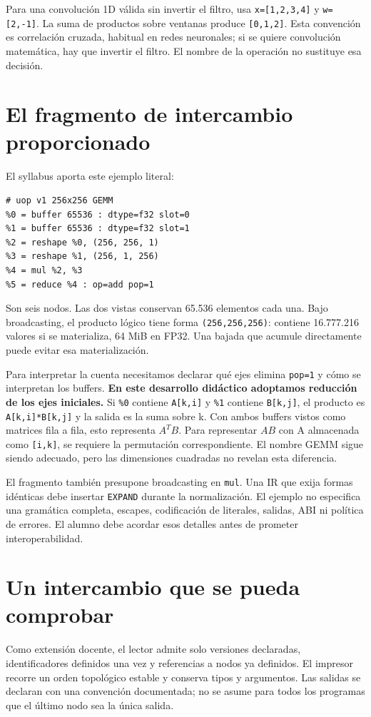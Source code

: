 \documentclass[12pt,a4paper,oneside]{report}
\begin{document}
Para una convolución 1D válida sin invertir el filtro, usa \texttt{x=[1,2,3,4]} y \texttt{w=[2,-1]}. La suma de productos sobre ventanas produce \texttt{[0,1,2]}. Esta convención es correlación cruzada, habitual en redes neuronales; si se quiere convolución matemática, hay que invertir el filtro. El nombre de la operación no sustituye esa decisión.

\section{El fragmento de intercambio proporcionado}
El syllabus aporta este ejemplo literal:

\begin{lstlisting}
# uop v1 256x256 GEMM
%0 = buffer 65536 : dtype=f32 slot=0
%1 = buffer 65536 : dtype=f32 slot=1
%2 = reshape %0, (256, 256, 1)
%3 = reshape %1, (256, 1, 256)
%4 = mul %2, %3
%5 = reduce %4 : op=add pop=1
\end{lstlisting}
Son seis nodos. Las dos vistas conservan 65.536 elementos cada una. Bajo broadcasting, el producto lógico tiene forma \texttt{(256,256,256)}: contiene 16.777.216 valores si se materializa, 64 MiB en FP32. Una bajada que acumule directamente puede evitar esa materialización.

Para interpretar la cuenta necesitamos declarar qué ejes elimina \texttt{pop=1} y cómo se interpretan los buffers. \textbf{En este desarrollo didáctico adoptamos reducción de los ejes iniciales.} Si \texttt{\%0} contiene \texttt{A[k,i]} y \texttt{\%1} contiene \texttt{B[k,j]}, el producto es \texttt{A[k,i]*B[k,j]} y la salida es la suma sobre k. Con ambos buffers vistos como matrices fila a fila, esto representa $A^T B$. Para representar $A B$ con A almacenada como \texttt{[i,k]}, se requiere la permutación correspondiente. El nombre GEMM sigue siendo adecuado, pero las dimensiones cuadradas no revelan esta diferencia.

El fragmento también presupone broadcasting en \texttt{mul}. Una IR que exija formas idénticas debe insertar \texttt{EXPAND} durante la normalización. El ejemplo no especifica una gramática completa, escapes, codificación de literales, salidas, ABI ni política de errores. El alumno debe acordar esos detalles antes de prometer interoperabilidad.

\section{Un intercambio que se pueda comprobar}
Como extensión docente, el lector admite solo versiones declaradas, identificadores definidos una vez y referencias a nodos ya definidos. El impresor recorre un orden topológico estable y conserva tipos y argumentos. Las salidas se declaran con una convención documentada; no se asume para todos los programas que el último nodo sea la única salida.
\end{document}
